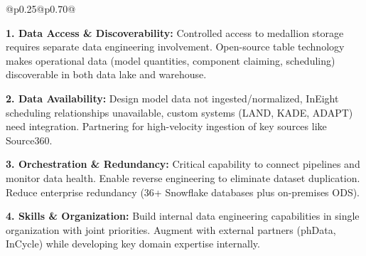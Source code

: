 \documentclass[12pt, a4paper]{article}
\begin{document}
{\begin{tabular}{@{}p{0.25\textwidth}@{\hspace{0.05\textwidth}}p{0.70\textwidth}@{}}
\begin{minipage}[t]{\linewidth}
         \vspace{0.2em}
         
         {\scriptsize
    {\footnotesize \textbf{1. Data Access \& Discoverability:}} Controlled access to medallion storage requires separate data engineering involvement. Open-source table technology makes operational data (model quantities, component claiming, scheduling) discoverable in both data lake and warehouse.
    
    \vspace{0.15em}
    
    {\footnotesize \textbf{2. Data Availability:}} Design model data not ingested/normalized, InEight scheduling relationships unavailable, custom systems (LAND, KADE, ADAPT) need integration. Partnering for high-velocity ingestion of key sources like Source360.
    
    \vspace{0.15em}
    
    {\footnotesize \textbf{3. Orchestration \& Redundancy:}} Critical capability to connect pipelines and monitor data health. Enable reverse engineering to eliminate dataset duplication. Reduce enterprise redundancy (36+ Snowflake databases plus on-premises ODS).
    
    \vspace{0.15em}
    
    {\footnotesize \textbf{4. Skills \& Organization:}} Build internal data engineering capabilities in single organization with joint priorities. Augment with external partners (phData, InCycle) while developing key domain expertise internally.
         }
     \end{minipage}
     \end{tabular}
     }

     \newpage

     {\footnotesize
     }

     \vspace{-0.5em}
\end{document}
